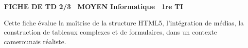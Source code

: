\documentclass[11pt]{article}
\begin{document}
\pagestyle{empty}

\ifdefined\tdheader\else
  \newenvironment{tdheader}{%
    \begin{tcolorbox}[colback=blue!85!black, coltext=white, sharp corners, boxrule=0pt, left=6pt, right=6pt, top=4pt, bottom=4pt, width=\linewidth, before=\par\medskip, after=\par\medskip]
  }{%
    \end{tcolorbox}%
  }%
\fi

\begin{tdheader}
{\color{white}\bfseries\small FICHE DE TD 2/3 \textbullet\ MOYEN \hfill Informatique \textbullet\ 1re TI\par}
\end{tdheader}
\vspace{4pt}

Cette fiche évalue la maîtrise de la structure HTML5, l'intégration de médias, la construction de tableaux complexes et de formulaires, dans un contexte camerounais réaliste.
\end{document}
